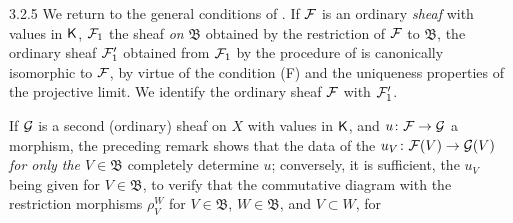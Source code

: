 \documentclass[../main.tex]{subfiles}
\begin{document}
\begin{env}{3.2.5}
We return to the general conditions of . If $\mathcal{F}$ is an ordinary
\emph{sheaf} with values in $\mathsf{K}$, $\mathcal{F}_1$ the sheaf \emph{on} $\mathfrak{B}$ obtained
by the restriction of $\mathcal{F}$ to $\mathfrak{B}$, the ordinary sheaf $\mathcal{F}_1'$
obtained from $\mathcal{F}_1$ by the procedure of  is canonically
isomorphic to $\mathcal{F}$, by virtue of the condition (F) and the uniqueness properties
of the projective limit. We identify the ordinary sheaf $\mathcal{F}$ with $\mathcal{F}_1'$.

If $\mathcal{G}$ is a second (ordinary) sheaf on $X$ with values in $\mathsf{K}$, and
$u\colon\mathcal{F}\to\mathcal{G}$ a morphism, the preceding remark shows that the data of
the $u_V\colon\mathcal{F}(V)\to\mathcal{G}(V)$ \emph{for only the $V\in\mathfrak{B}$} completely
determine $u$; conversely, it is sufficient, the $u_V$ being given for $V\in\mathfrak{B}$,
to verify that the commutative diagram with the restriction morphisms $\rho_V^W$ for
$V\in\mathfrak{B}$, $W\in\mathfrak{B}$, and $V\subset W$, for
\end{env}

\end{document}
